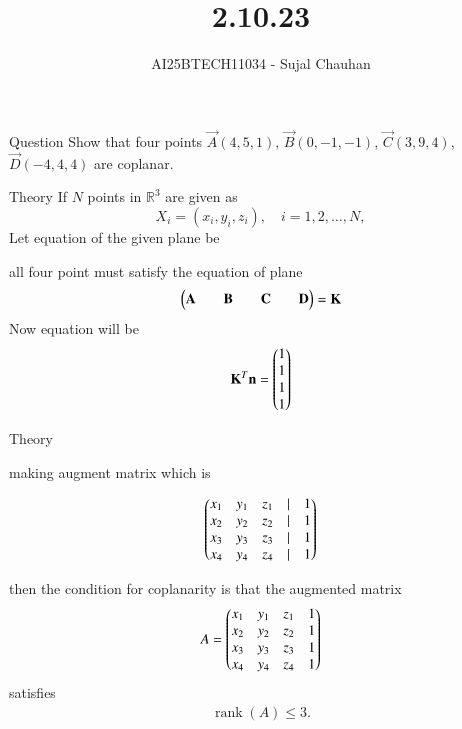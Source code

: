 \documentclass{beamer}
\title
{2.10.23}
\author 
{AI25BTECH11034 - Sujal Chauhan }
\begin{document}
\frame{\titlepage}
\begin{frame}{Question}
Show that four points $\vec{A}(4,5,1)$, $\vec{B}(0,-1,-1)$, $\vec{C}(3,9,4)$, $\vec{D}(-4,4,4)$ are coplanar.




\end{frame}

\begin{frame}{Theory}
   If $N$ points in $\mathbb{R}^3$ are given as 
\[
X_i = (x_i, y_i, z_i), \quad i = 1,2,\dots,N,
\] 
Let equation of the given plane be 

all four point must satisfy the equation of plane 
\begin{align}
\begin{pmatrix}\mathbf{A}&&\mathbf{B}&&\mathbf{C} && \mathbf{D}\end{pmatrix}=\mathbf{K}
\end{align}
Now equation will be 
\begin{align}
    \mathbf{K}^T\mathbf{n}=\begin{pmatrix}1 \\ 1\\ 1\\ 1\end{pmatrix}
\end{align}
\end{frame}

\begin{frame}{Theory}
    

making augment matrix which is 

    \begin{align}
 \begin{pmatrix}
x_1 & y_1 & z_1 & | & 1 \\
x_2 & y_2 & z_2 & | & 1 \\
x_3 & y_3 & z_3 & | & 1 \\
x_4 & y_4 & z_4 & | & 1
\end{pmatrix} 
\end{align}


then the condition for coplanarity is that the augmented matrix
\begin{align}
A = \begin{pmatrix}
x_1 & y_1 & z_1 & 1 \\
x_2 & y_2 & z_2 & 1 \\
x_3& y_3 & z_3 & 1 \\
x_4 & y_4 & z_4 & 1
\end{pmatrix}
\end{align}
satisfies
\begin{align}
\operatorname{rank}(A) \leq 3.
\end{align}
\end{frame}
\end{document}
